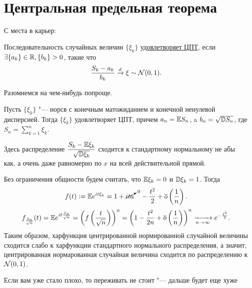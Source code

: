 \documentclass[../TV&MS.tex]{subfiles}
\begin{document}
    
\section{Центральная предельная теорема}

С места в карьер:

\begin{Def}
    Последовательность случайных величин $\{ \xi_k \}$ \uline{удовлетворяет ЦПТ}, если $\exists \{ a_k \} \in \mathbb{R}, \{ b_k \} > 0$, такие что 
    \[
        \dfrac{S_k - a_k}{b_k} \xrightarrow[]{d} \xi \sim \mathcal{N}(0, 1)
    .\] 
\end{Def}

Разомнемся на чем-нибудь попроще.

\begin{Th}
    Пусть $\{ \xi_k \}$ "--- норсв с конечным матожиданием и конечной ненулевой дисперсией. Тогда $\{ \xi_k \}$ удовлетворяет ЦПТ, причем $a_n = \mathbb{E} S_n$,
    a $b_n = \sqrt{\mathbb{D} S_n}$, где  $S_n = \sum\limits_{k=1}^{n} \xi_k$.
\end{Th}

\begin{Note}
    Здесь распределение $\dfrac{S_k - \mathbb{E} \xi_k}{\sqrt{\mathbb{D} \xi_k}}$ сходится к стандартному нормальному не абы как, а очень даже равномерно по $x$ на всей действительной прямой.
\end{Note} 

\begin{Proof}
    Без ограничения общности будем считать, что $\mathbb{E} \xi_k = 0$ и  $\mathbb{D} \xi_k = 1$.
    Тогда 
     \[
         f(t) := \mathbb{E} e^{it\xi_k} = 1 + \cancelto{\text{\scriptsize{0}}}{ita} \quad - \dfrac{t^2}{2} + \overline{o} \left( \dfrac{1}{n} \right) 
    .\]
    \[
        f_{\frac{S_n}{\sqrt{n}}} (t) = \mathbb{E} e^{it\frac{S_n}{\sqrt{n}}} = 
        \left( f \left( \dfrac{t}{\sqrt{n}} \right) \right)^{n} = 
        \left( 1 - \dfrac{t^2}{2n} + \overline{o} \left( \dfrac{1}{n} \right)  \right)^{n} 
        \xrightarrow[n \rightarrow \infty]{} e^{-\frac{t^2}{2}}
    .\] 
    Таким образом, харфункция центрированной нормированной случайной величины сходится слабо к харфункции стандартного нормального распределения, а значит, центрированная нормарованная случайная величина сходится по распределению к $\mathcal{N}(0, 1)$.
\end{Proof} 

\begin{Why}
    Если вам уже стало плохо, то переживать не стоит "--- дальше будет еще хуже
\end{Why} 
\end{document}
